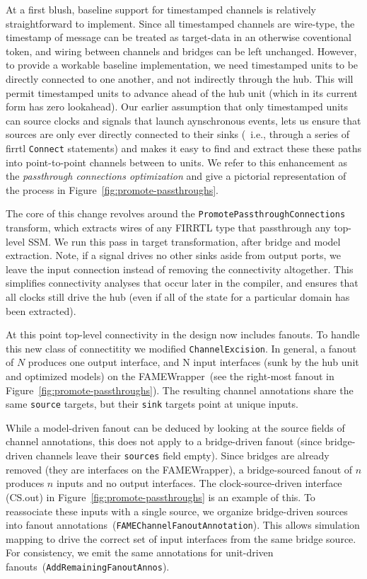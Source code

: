 At a first blush, baseline support for timestamped channels is relatively
straightforward to implement. Since all timestamped channels are wire-type, the
timestamp of message can be treated as target-data in an otherwise coventional
token, and wiring between channels and bridges can be left unchanged. However,
to provide a workable baseline implementation, we need timestamped units to be
directly connected to one another, and not indirectly through the hub.  This
will permit timestamped units to advance ahead of the hub unit (which in its current form has zero lookahead).
Our earlier assumption that only timestamped units
can source clocks and signals that launch aynschronous events, lets us ensure that sources are only
ever directly connected to their sinks (~i.e., through a series of firrtl
\texttt{Connect} statements) and makes it easy to find and extract these these
paths into point-to-point channels between to units. We refer to this enhancement
as the \emph{passthrough connections optimization} and give a pictorial representation of the process in Figure~\ref{fig:promote-passthroughs}.

The core of this change revolves around the
\texttt{PromotePassthroughConnections} transform, which extracts wires of any FIRRTL type that
passthrough any top-level SSM. We run this pass in target transformation, after bridge and model extraction.
Note, if a signal drives no other sinks aside from output ports, we leave the
input connection instead of removing the connectivity altogether.  This
simplifies connectivity analyses that occur later in the compiler, and ensures
that all clocks still drive the hub (even if all of the state for a particular
domain has been extracted).

At this point top-level connectivity in the design now includes fanouts. To
handle this new class of connectitity we modified \texttt{ChannelExcision}. In
general, a fanout of $N$ produces one output interface, and N input interfaces
(sunk by the hub unit and optimized models) on the FAMEWrapper~(see the
right-most fanout in Figure~\ref{fig:promote-passthroughs}). The resulting
channel annotations share the same \texttt{source} targets, but their \texttt{sink} targets point at unique
inputs.

While a model-driven fanout can be deduced by looking at the source fields of
channel annotations, this does not apply to a bridge-driven fanout (since
bridge-driven channels leave their \texttt{sources} field empty).  Since
bridges are already removed (they are interfaces on the FAMEWrapper), a
bridge-sourced fanout of $n$ produces $n$ inputs and no output interfaces. The clock-source-driven interface (CS.out) in
Figure~\ref{fig:promote-passthroughs} is an example of this.
To reassociate these inputs with a single source, we organize bridge-driven
sources into fanout annotations~(\texttt{FAMEChannelFanoutAnnotation}). This
allows simulation mapping to drive the correct set of input interfaces from the
same bridge source. For consistency, we emit the same annotations for
unit-driven fanouts~(\texttt{AddRemainingFanoutAnnos}).

